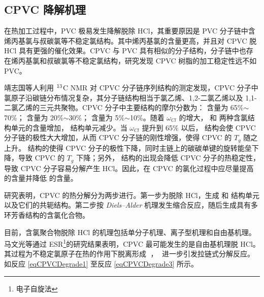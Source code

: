 \subsection{CPVC 降解机理}
在热加工过程中，PVC 极易发生降解脱除 HCl，其重要原因是 PVC 分子链中含烯丙基氯与叔碳氯等不稳定氯结构\cite{15}。其中烯丙基氯的含量更高，并且对 CPVC 脱 HCl 具有更强的催化效果。CPVC 与 PVC 具有相似的分子结构，分子链中也存在烯丙基氯和叔碳氯等不稳定氯结构，研究发现 CPVC 树脂的加工稳定性远不如 PVC\cite{6}。\par
\setatomsep{1.5em}
靖志国等人利用 $\rm{^{13}}$C NMR 对 CPVC 分子链序列结构的测定发现，CPVC 分子中氯原子沿碳链分布情况复杂，其分子链结构相当于氯乙烯、1,2-二氯乙烯以及 1,1-二氯乙烯的三元共聚物。CPVC 分子中主要结构的摩尔分数为： 含量为 65\%$\sim$70\%； 含量为 20\%$\sim$30\%； 含量为 5\%$\sim$10\%。随着 $\omega_{Cl}$ 的增大， 和  两种含氯结构单元的含量增加， 结构单元减少。当 $\omega_{Cl}$ 提升到 65\% 以后，  结构会使 CPVC 分子链的极性大大增加，从而 CPVC 分子链的刚性增强，使得 CPVC 的 $T_g$ 随之上升。 结构的使得 CPVC 分子的极性下降，同时主链上的碳碳单键的旋转能垒下降，导致 CPVC 的 $T_g$ 下降；另外， 结构的出现会降低 CPVC 分子的热稳定性，导致 CPVC 分子容易分解产生 HCl。因此，在 CPVC 的氯化过程中应尽量提高   的含量并降低   的含量\cite{4}。\par

研究表明，CPVC 的热分解分为两步进行\cite{12}。第一步为脱除 HCl，生成  和  结构单元以及它们的共轭结构。第二步按 \textit{Diels–Alder} 机理发生缩合反应，随后生成具有多环芳香结构的含氯化合物。\par
目前，含氯聚合物脱除 HCl 的机理包括单分子机理、离子型机理和自由基机理。马文光等\cite{22}通过 ESR\footnote{电子自旋法}的研究结果表明，CPVC 最可能发生的是自由基机理脱 HCl。其过程为不稳定氯原子在热的作用下脱离形成 $\;$，$\;$ 进一步引发拉链式分解反应。如反应 \eqref{eqCPVCDegrade1} 至反应 \eqref{eqCPVCDegrade3} 所示。

\setpolymerdelim[]
\setatomsep{2em}

